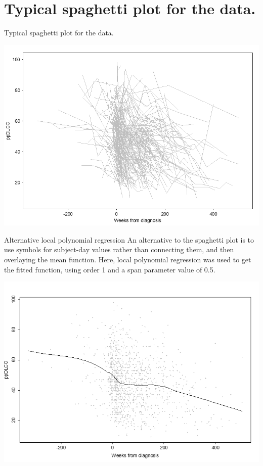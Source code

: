\documentclass[
  9pt,
  ignorenonframetext,
]{beamer}
\begin{document}
\hypertarget{typical-spaghetti-plot-for-the-data.}{%
\section{Typical spaghetti plot for the
data.}\label{typical-spaghetti-plot-for-the-data.}}

\begin{frame}{Typical spaghetti plot for the data.}
\tiny

\begin{center}\includegraphics[width=0.6\linewidth]{figs_L2/L2-f4} \end{center}

\tiny
\end{frame}

\begin{frame}{Alternative local polynomial regression}
\protect\hypertarget{alternative-local-polynomial-regression}{}
An alternative to the spaghetti plot is to use symbols for subject-day
values rather than connecting them, and then overlaying the mean
function. Here, local polynomial regression was used to get the fitted
function, using order 1 and a span parameter value of 0.5.

\tiny

\begin{center}\includegraphics[width=0.6\linewidth]{figs_L2/L2-f5} \end{center}

\tiny
\end{frame}
\end{document}

